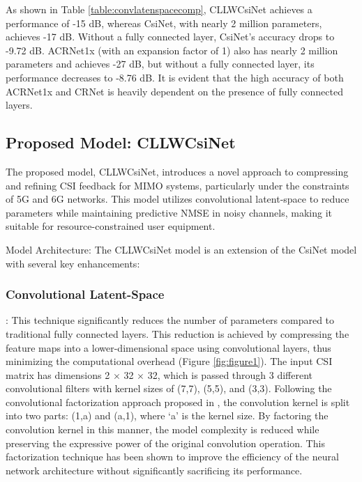 \documentclass[lettersize,journal]{IEEEtran}
\begin{document}
As shown in Table \ref{table:convlatenspacecomp}, CLLWCsiNet achieves a performance of -15 dB, whereas CsiNet, with nearly 2 million parameters, achieves -17 dB. Without a fully connected layer, CsiNet’s \cite{abe} accuracy drops to -9.72 dB. ACRNet1x \cite{abx} (with an expansion factor of 1) also has nearly 2 million parameters and achieves -27 dB, but without a fully connected layer, its performance decreases to -8.76 dB. It is evident that the high accuracy of both ACRNet1x \cite{abx} and CRNet \cite{abn} is heavily dependent on the presence of fully connected layers.









\subsection{Proposed Model: CLLWCsiNet }
The proposed model, CLLWCsiNet, introduces a novel approach to compressing and refining CSI feedback for MIMO systems, particularly under the constraints of 5G and 6G networks. This model utilizes convolutional latent-space to reduce parameters while maintaining predictive NMSE in noisy channels, making it suitable for resource-constrained user equipment.



Model Architecture:
The CLLWCsiNet model is an extension of the CsiNet model with several key enhancements:

\subsubsection{Convolutional Latent-Space}:
This technique significantly reduces the number of parameters compared to traditional fully connected layers. This reduction is achieved by compressing the feature maps into a lower-dimensional space using convolutional layers, thus minimizing the computational overhead (Figure \ref{fig:figure1}). 
The input CSI matrix has dimensions 2 \begin{math} \times \end{math} 32 \begin{math} \times \end{math} 32, which is passed through 3 different convolutional filters with kernel sizes of (7,7), (5,5), and (3,3). Following the convolutional factorization approach proposed in \cite{abn}, the convolution kernel is split into two parts: (1,a) and (a,1), where ‘a’ is the kernel size. By factoring the convolution kernel in this manner, the model complexity is reduced while preserving the expressive power of the original convolution operation. This factorization technique has been shown to improve the efficiency of the neural network architecture without significantly sacrificing its performance.
\end{document}
